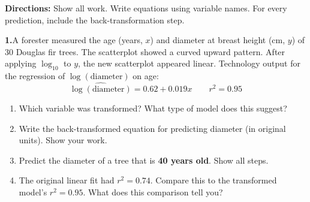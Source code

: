 \documentclass[10pt]{article}
\begin{document}
\namedateperiod

\vspace{0.18in}

\noindent\textbf{Directions:} Show all work. Write equations using variable names. For every
prediction, include the back-transformation step.

\vspace{0.14in}

\noindent\textbf{1.}\enspace A forester measured the age (years, $x$) and diameter at breast
height (cm, $y$) of 30 Douglas fir trees. The scatterplot showed a curved upward pattern.
After applying $\log_{10}$ to $y$, the new scatterplot appeared linear. Technology output
for the regression of $\log(\text{diameter})$ on age:
\[
  \widehat{\log(\text{diameter})} = 0.62 + 0.019x \qquad r^2 = 0.95
\]

\begin{enumerate}[label=\textbf{(\alph*)}, leftmargin=2em, itemsep=0.18in]

  \item Which variable was transformed? What type of model does this suggest?\\[8pt]

  \item Write the back-transformed equation for predicting diameter (in original units).
        Show your work.\\[8pt]

  \item Predict the diameter of a tree that is \textbf{40 years old}. Show all steps.\\[8pt]

  \item The original linear fit had $r^2 = 0.74$. Compare this to the transformed model's
        $r^2 = 0.95$. What does this comparison tell you?\\[8pt]

\end{enumerate}
\end{document}
